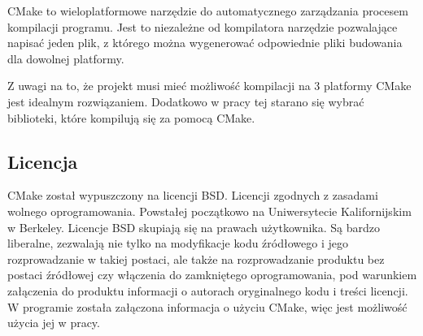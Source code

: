 \par
CMake to wieloplatformowe narzędzie do automatycznego zarządzania procesem kompilacji programu.
Jest to niezależne od kompilatora narzędzie pozwalające napisać jeden plik, z którego można wygenerować odpowiednie pliki budowania dla dowolnej platformy.
\par
Z uwagi na to, że projekt musi mieć możliwość kompilacji na 3 platformy CMake jest idealnym rozwiązaniem.
Dodatkowo w pracy tej starano się wybrać biblioteki, które kompilują się za pomocą CMake.

\subsection*{Licencja}

CMake został wypuszczony na licencji BSD.
Licencji zgodnych z zasadami wolnego oprogramowania.
Powstałej początkowo na Uniwersytecie Kalifornijskim w Berkeley.
Licencje BSD skupiają się na prawach użytkownika.
Są bardzo liberalne, zezwalają nie tylko na modyfikacje kodu źródłowego i jego rozprowadzanie w takiej postaci, ale także na rozprowadzanie produktu bez postaci źródłowej czy włączenia do zamkniętego oprogramowania, pod warunkiem załączenia do produktu informacji o autorach oryginalnego kodu i treści licencji.
W programie została załączona informacja o użyciu CMake, więc jest możliwość użycia jej w pracy.